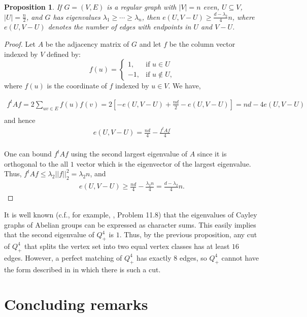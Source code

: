 \documentclass[11pt]{article}
\newtheorem{prop}[theo]{Proposition}
\begin{document}
\begin{prop}
If $G = (V, E)$ is a regular graph with $|V| = n$ even, 
$U \subseteq V$, $|U| = \frac{n}{2}$, and $G$ 
has eigenvalues $\lambda_1 \geq \cdots \geq \lambda_n$, 
then $e(U, V - U) \geq \frac{d - \lambda_2}{4}n$, 
where $e(U, V-U)$ denotes the number of edges with endpoints 
in $U$ and $V - U$.
\end{prop}

\begin{proof}
    Let $A$ be the adjacency matrix 
of $G$ and let $f$ be the column vector indexed by $V$ defined by:
    \[
    f(u)= 
\begin{cases}
    1,& \text{if } u \in U \\
    -1,              & \text{if $u \notin U$,}
\end{cases}
\] 
where $f(u)$ is the coordinate of $f$ indexed by $u \in V$. We have,

\begin{align*}
    f^tAf = 2 \sum_{uv \in E}f(u)f(v) = 
2[-e(U, V-U) + \frac{nd}{2} - e(U, V-U)] = nd - 4e(U, V-U) \\
\end{align*}
and hence
\begin{align*}
    e(U, V-U) = \frac{nd}{4} - \frac{f^tAf}{4} \\
\end{align*}

One can bound $f^tAf$ using the second largest eigenvalue of $A$ 
since it is orthogonal to the all $1$ vector which is the eigenvector of
the largest eigenvalue. 
Thus, $f^tAf \leq \lambda_2||f||_2^2 =\lambda_2n$, and 
\begin{align*}
    e(U, V-U) \geq \frac{nd}{4} - \frac{\lambda_2n}{4} 
= \frac{d-\lambda_2}{4}n.
\end{align*} 
\end{proof}
It is well known (c.f., for example, \cite{Lo}, Problem 11.8)
that the eigenvalues of Cayley graphs of Abelian
groups can be expressed as character sums. This easily implies that
the second eigenvalue of $Q_{+}^{4}$ is $1$. Thus, by the previous 
proposition, any cut of $Q_{+}^{4}$ that splits the vertex set into 
two equal vertex classes
has at least $16$ edges. However, a perfect matching of $Q_+^4$ has 
exactly $8$ edges, so $Q_+^4$ cannot have the form described
in \cite{BCKW} in which there is such a cut. 


\section{Concluding remarks}
\end{document}
